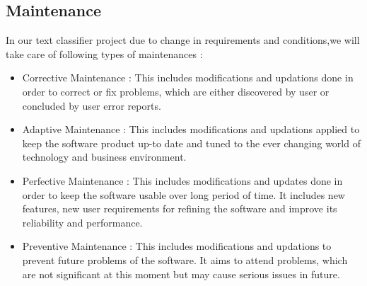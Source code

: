 \subsection{Maintenance}
In our text classifier project due to change in requirements and conditions,we will take care of following types of maintenances : 
\begin{itemize}
\item Corrective Maintenance : This includes modifications and updations done in order to correct or fix problems, which are either discovered by user or concluded by user error reports.
\item Adaptive Maintenance : This includes modifications and updations applied to keep the software product up-to date and tuned to the ever changing world of technology and business environment.
\item Perfective Maintenance : This includes modifications and updates done in order to keep the software usable over long period of time. It includes new features, new user requirements for refining the software and improve its reliability and performance.
\item Preventive Maintenance : This includes modifications and updations to prevent future problems of the software. It aims to attend problems, which are not significant at this moment but may cause serious issues in future.
\end{itemize}
